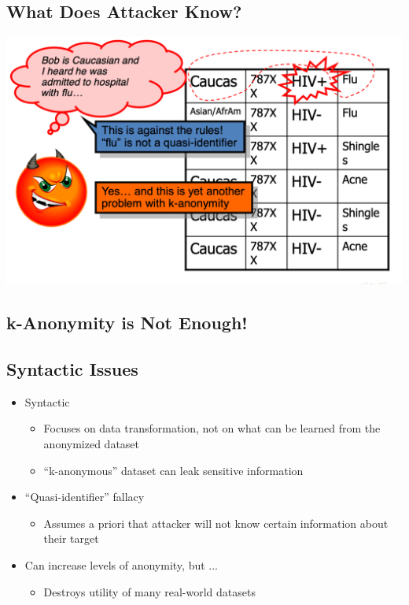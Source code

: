 \documentclass[11pt]{article}
\theoremstyle{definition}
\begin{document}
\subsection{What Does Attacker Know?}
\includegraphics[width=\textwidth/3]{26.png}

\subsection{k-Anonymity is Not Enough!}
\subsection{Syntactic Issues}
\begin{itemize}
    \item Syntactic
    \begin{itemize}
        \item Focuses on data transformation, not on what can be learned from the anonymized dataset
        \item “k-anonymous” dataset can leak sensitive information
    \end{itemize}
    \item “Quasi-identifier” fallacy
    \begin{itemize}
        \item Assumes a priori that attacker will not know certain information about their target
    \end{itemize}
    \item Can increase levels of anonymity, but ...
    \begin{itemize}
        \item Destroys utility of many real-world datasets
    \end{itemize}
\end{itemize}
\end{document}
